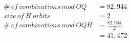 \documentclass[preview, border=2mm]{standalone}
\begin{document}
\vspace*{\fill}

{\fontsize{32pt}{40pt}\selectfont
    \begin{align*}
        \#\ of\ combinations\ mod\ OQ &= 82{,}944 \\
        size\ of\ H\ orbits &= 2 \\
        \#\ of\ combinations\ mod\ OQH &= \frac{82{,}944}{2} \\
            &= 41{,}472
    \end{align*}
}

\vspace*{\fill}
\end{document}
